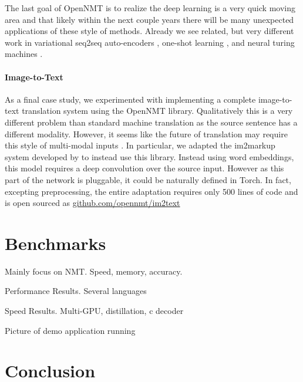 \documentclass[11pt]{article}
\begin{document}
The last goal of OpenNMT is to realize the deep learning is a very
quick moving area and that likely within the next couple years there
will be many unexpected applications of these style of
methods. Already we see related, but very different work in
variational seq2seq auto-encoders \cite{}, one-shot learning \cite{},
and neural turing machines \cite{}. 


\paragraph{Image-to-Text}

As a final case study, we experimented with implementing a complete
image-to-text translation system using the OpenNMT
library. Qualitatively this is a very different problem than standard
machine translation as the source sentence has a different modality.
However, it seems like the future of translation may require this
style of multi-modal inputs \cite{}. In particular, we adapted the
im2markup system developed by \cite{} to instead use this library.
Instead using word embeddings, this model requires a deep convolution
over the source input. However as this part of the network is
pluggable, it could be naturally defined in Torch. In fact, excepting
preprocessing, the entire adaptation requires only 500 lines of code and 
is open sourced as \url{github.com/opennmt/im2text} 


\section{Benchmarks}

Mainly focus on NMT. Speed, memory, accuracy. 

\begin{table}
  \centering
  
  \caption{Performance Results. Several languages}
\end{table}


\begin{table}
  \centering
  
  \caption{Speed Results. Multi-GPU, distillation, c decoder}
\end{table}

Picture of demo application running 

\section{Conclusion}




\end{document}
